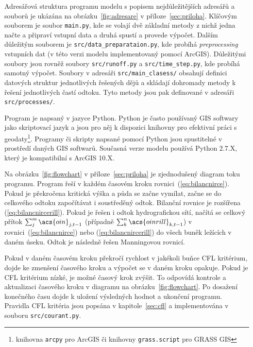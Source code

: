 Adresářová struktura programu modelu \smod s popisem nejdůležitějších adresářů a souborů je ukázána na obrázku~\ref{fig:adresare} v příloze~\ref{sec:priloha}. Klíčovým souborem  je  soubor {\tt main.py}, kde se volají dvě základní metody z nichž jedna načte a připraví vstupní data a druhá spustí a provede výpočet.  Dalším důležitým souborem je {\tt src/data\_preparataion.py}, kde probíhá  {\it preprocessing} vstupních dat (v této verzi modelu implementovaný pomocí ArcGIS). Důležitými soubory jsou rovněž soubory {\tt src/runoff.py} a {\tt src/time\_step.py}, kde probíhá samotný výpočet. Soubory v adresáři {\tt src/main\_clasess/} obsahují definici datových struktur jednotlivých řešených dějů a skládají dohromady metody k řešení jednotlivých častí odtoku. Tyto metody jsou pak definované v adresáři {\tt src/processes/}. 

Program \smod je napsaný v jazyce Python. Python je často používaný GIS softwary jako skriptovací jazyk a jsou pro něj k dispozici knihovny pro efektivní práci s geodaty\footnote{knihovna {\tt arcpy} pro ArcGIS či knihovny {\tt grass.script} pro GRASS GIS}. Programy či skripty napsané pomocí Python jsou spustitelné v prostředí daných GIS softwarů. Současná verze modelu \smod používá Python 2.7.X, který je kompatibilní s ArcGIS 10.X.

Na obrázku~\ref{fig:flowchart} v příloze~\ref{sec:priloha} je zjednodušený diagram toku programu. Program řeší v každém časovém kroku rovnici~(\ref{eq:bilancnirce}). Pokud je překročena kritická výška a půda se začne vymílat, začne se do celkového  odtoku  započítávat i soustředěný odtok. Bilanční rovnice je rozšířena (\ref{eq:bilancnircerill}). Pokud je řešen i odtok hydrografickou sítí, načítá se celkový přítok $\sum_j^m \acs{oin}_{j,t-1}$ (případně $\sum_k^n \acs{oinrill}_{k,t-1}$) v rovnici~(\ref{eq:bilancnirce})  nebo (\ref{eq:bilancnircerill}) do všech buněk ležících v daném úseku. Odtok je následně řešen Manningovou rovnicí.

Pokud v daném časovém kroku překročí rychlost v jakékoli buňce \acs{CFL} kritérium, dojde ke zmenšení časového kroku a výpočet se v daném kroku opakuje. Pokud je \acs{CFL} kritérium nízké, je možné časový krok zvýšit. To odpovídá kontrole a aktualizaci časového kroku v diagramu na obrázku~\ref{fig:flowchart}. Po dosažení konečného času dojde k uložení výsledných hodnot a ukončení programu. Pravidla \acs{CFL} kritéria jsou popsána v kapitole~\ref{sec:cfl} a implementována v souboru {\tt src/courant.py}.





